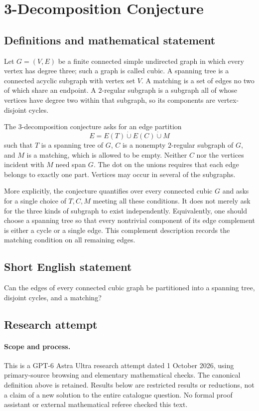 \documentclass[11pt,a4paper]{article}
\begin{document}
\section*{3-Decomposition Conjecture}\label{statement}

\subsection{Definitions and mathematical statement}
Let $G=(V,E)$ be a finite connected simple undirected graph in which
every vertex has degree three; such a graph is called cubic. A
spanning tree is a connected acyclic subgraph with vertex set $V$.
A matching is a set of edges no two of which share an endpoint. A
$2$-regular subgraph is a subgraph all of whose vertices have degree
two within that subgraph, so its components are vertex-disjoint
cycles.

The $3$-decomposition conjecture asks for an edge partition
\[
 E=E(T)\mathbin{\dot\cup}E(C)\mathbin{\dot\cup}M
\]
such that $T$ is a spanning tree of $G$, $C$ is a nonempty
$2$-regular subgraph of $G$, and $M$ is a matching, which is allowed
to be empty. Neither $C$ nor the vertices incident with $M$ need
span $G$. The dot on the unions requires that each edge belongs to
exactly one part. Vertices may occur in several of the subgraphs.

More explicitly, the conjecture quantifies over every connected
cubic $G$ and asks for a single choice of $T,C,M$ meeting all these
conditions. It does not merely ask for the three kinds of subgraph
to exist independently. Equivalently, one should choose a spanning
tree so that every nontrivial component of its edge complement is
either a cycle or a single edge. This complement description records
the matching condition on all remaining edges.
\subsection{Short English statement}
Can the edges of every connected cubic graph be partitioned into a spanning tree, disjoint cycles, and a matching?
\subsection{Research attempt}
\paragraph{Scope and process.}
This is a GPT-6 Astra Ultra research attempt dated 1 October 2026, using
primary-source browsing and elementary mathematical checks. The canonical
definition above is retained. Results below are restricted results or
reductions, not a claim of a new solution to the entire catalogue question.
No formal proof assistant or external mathematical referee checked this text.
\end{document}
